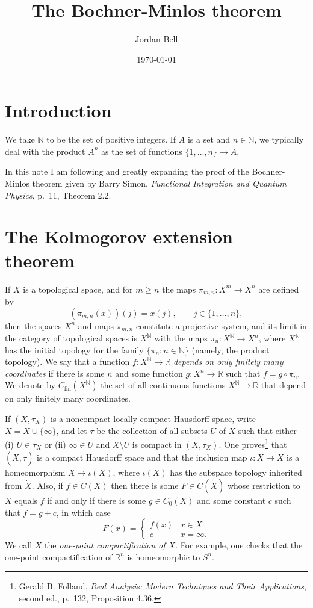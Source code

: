 \documentclass{article}
\theoremstyle{definition}
\theoremstyle{definition}
\begin{document}
\title{The Bochner-Minlos theorem}
\author{Jordan Bell}
\date{\today}

\maketitle

\section{Introduction}
We take $\mathbb{N}$ to be the set of positive integers.
 If $A$ is a set and $n \in \mathbb{N}$, we typically deal with the product $A^n$ as the set of functions $\{1,\ldots,n\} \to A$.

In this note I am following and greatly expanding the proof of the Bochner-Minlos theorem given by Barry Simon, {\em Functional Integration and Quantum Physics}, p.~11, Theorem 2.2.

\section{The Kolmogorov extension theorem}
If $X$ is a topological space,  and  for $m \geq n$ the maps $\pi_{m,n}:X^m \to X^n$ are defined by
\[
(\pi_{m,n}(x))(j)=
x(j), \qquad j \in \{1,\ldots,n\},
\]
 then the spaces
$X^n$ and maps $\pi_{m,n}$ constitute a projective system, and its  limit in the category of topological spaces is $X^\mathbb{N}$ with the maps $\pi_n:X^\mathbb{N} \to X^n$,
where $X^\mathbb{N}$ has the initial topology for the family $\{\pi_n: n \in \mathbb{N}\}$ (namely,  the product topology).
We say that a function $f:X^\mathbb{N} \to \mathbb{R}$ {\em depends on only finitely many coordinates} if there is some $n$ and some function $g:X^n \to \mathbb{R}$ such that
$f=g \circ \pi_n$. We denote by
$C_{\mathrm{fin}}(X^\mathbb{N})$ the set of all continuous functions $X^\mathbb{N} \to \mathbb{R}$ that depend on only finitely many coordinates.


If $(X,\tau_X)$ is a noncompact locally compact Hausdorff space, write $\dot{X}=X \cup \{\infty\}$, and let $\tau$ be the collection of all subsets $U$ of $\dot{X}$ such that
either (i) $U \in \tau_X$ or (ii) $\infty \in U$ and $X \setminus U$ is compact in $(X,\tau_X)$.
One proves\footnote{Gerald B. Folland,
{\em Real Analysis: Modern Techniques and Their Applications}, second ed., p.~132, Proposition 4.36.} that 
$(\dot{X},\tau)$ is a compact Hausdorff space and that the inclusion map $\iota:X \to \dot{X}$ is a homeomorphism $X \to \iota(X)$, where
$\iota(X)$ has the subspace topology inherited from $\dot{X}$. Also, if $f \in C(X)$ then there is some $F \in C(\dot{X})$ whose restriction
to $X$ equals $f$ if and only if there is some $g \in C_0(X)$ and some constant $c$ such that $f=g+c$, in which case
\[
F(x) = \begin{cases}
f(x)&x \in X\\
c&x=\infty.
\end{cases}
\]
We call $\dot{X}$ the {\em one-point compactification of $X$}. For example, one checks that the one-point compactification of $\mathbb{R}^n$ is homeomorphic
to $S^n$. 
\end{document}
